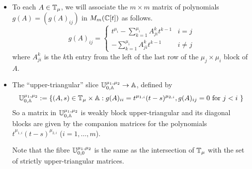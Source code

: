 \documentclass[draft]{article}
\begin{document}
\begin{itemize}
    
    \item To each $ A \in \mathbb T_\mu$, we will associate the $m\times m$ matrix 
    of polynomials 
    $ g(A) = \left( g(A)_{ij} \right)$ in $ M_m(\mathbb C[t]) $ as follows.
    \begin{equation}
        \label{eq:mvyofa}
        g(A)_{ij} = 
    \begin{cases} t^{\mu_i} - \sum_{k=1}^{\mu_i} A^k_{ji} t^{k-1} & i = j \\
            - \sum_{k=1}^{\mu_i} A^k_{ji} t^{k-1} & i \ne j
    \end{cases}
    \end{equation}
    where $A^k_{ji}$ is the $k$th entry from the left of the last row of the $\mu_j\times\mu_i$ block of $A$. 

    
    \item The ``upper-triangular'' \mvy slice $\mathbb U^{\mu_1, \mu_2}_{0,\mathbb A}\rightarrow \mathbb A $, defined by
    $$
    \mathbb U^{\mu_1, \mu_2}_{0,\mathbb A} := \{ (A,s) \in \mathbb T_\mu \times \mathbb A : g(A)_{ii} = t^{\mu_{1,i}} (t-s)^{\mu_{2,i}}, g(A)_{ij} = 0 \text{ for $ j < i $ }\}
    $$
    So a matrix in $\mathbb U^{\mu_1, \mu_2}_{0,\mathbb A}$ is weakly block upper-triangular and its diagonal blocks are given by the companion matrices for the polynomials $t^{\mu_{1,i}} (t-s)^{\mu_{2,i}}$ ($i=1,\dots,m$).
    
    Note that the fibre $  \mathbb U^{\mu_1, \mu_2}_{0,0}$ is the same as the intersection of $ \mathbb T_\mu $ with the set of strictly upper-triangular matrices.


\end{itemize}
\end{document}
